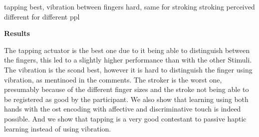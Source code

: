 tapping best, vibration between fingers hard, same for stroking
stroking perceived different for different ppl

\textbf{Results}

The tapping actuator is the best one due to it being able to distinguish between the fingers, this led to a slightly higher performance than with the other Stimuli.
The vibration is the scond best, however it is hard to distinguish the finger using vibration, as mentinoed in the comments.
The stroker is the worst one, presumably because of the different finger sizes and the stroke not being able to be registered as good by the participant.
We also show that learning using both hands with the ost encoding with affective and discriminative touch is indeed possible.
And we show that tapping is a very good contestant to passive haptic learning instead of using vibration.






